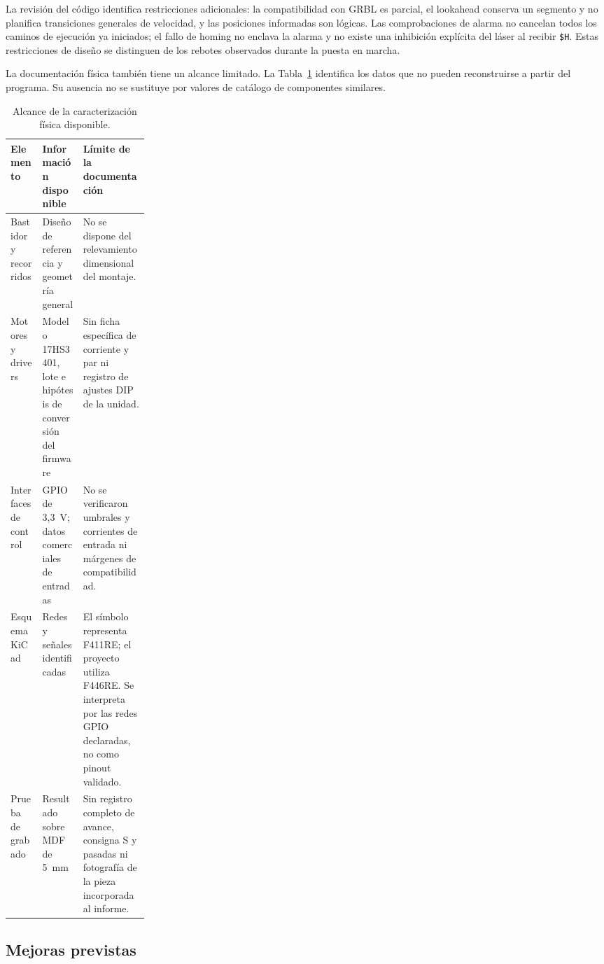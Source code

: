 \documentclass[blue,fullpaper]{ludusofficial}  %
\begin{document}
La revisión del código identifica restricciones
adicionales: la compatibilidad con GRBL es parcial,
el lookahead conserva un segmento y no planifica
transiciones generales de velocidad, y las posiciones
informadas son lógicas. Las comprobaciones de alarma
no cancelan todos los caminos de ejecución ya iniciados;
el fallo de homing no enclava la alarma y no existe
una inhibición explícita del láser al recibir
\texttt{\$H}. Estas restricciones de diseño se distinguen
de los rebotes observados durante la puesta en marcha.

La documentación física también tiene un alcance
limitado. La Tabla~\ref{tab:alcance-documental}
identifica los datos que no pueden reconstruirse
a partir del programa. Su ausencia no se sustituye
por valores de catálogo de componentes similares.

\begin{table}[htbp]
\centering\small
\caption{Alcance de la caracterización física disponible.}
\label{tab:alcance-documental}
\begin{tabularx}{\linewidth}{p{0.23\linewidth}XX}
\hline
Elemento & Información disponible & Límite de la documentación \\
\hline
Bastidor y recorridos & Diseño de referencia y geometría general & No se dispone del relevamiento dimensional del montaje. \\
Motores y drivers & Modelo 17HS3401, lote e hipótesis de conversión del firmware & Sin ficha específica de corriente y par ni registro de ajustes DIP de la unidad. \\
Interfaces de control & GPIO de 3,3~V; datos comerciales de entradas & No se verificaron umbrales y corrientes de entrada ni márgenes de compatibilidad. \\
Esquema KiCad & Redes y señales identificadas & El símbolo representa F411RE; el proyecto utiliza F446RE. Se interpreta por las redes GPIO declaradas, no como pinout validado. \\
Prueba de grabado & Resultado sobre MDF de 5~mm & Sin registro completo de avance, consigna S y pasadas ni fotografía de la pieza incorporada al informe. \\
\hline
\end{tabularx}
\end{table}

\subsection{Mejoras previstas}
\end{document}
